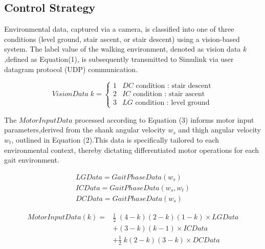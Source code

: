 \documentclass[journal,article,submit,pdftex,moreauthors]{Definitions/mdpi}
\begin{document}
\subsection{Control Strategy}
Environmental data, captured via a camera, is classified into one of three conditions (level ground, stair ascent, or stair descent) using a vision-based system. The label value of the walking environment, denoted as vision data $k$,defined as Equation(1), is subsequently transmitted to Simulink via user datagram protocol (UDP) communication.
\begin{linenomath}
\begin{equation}
\text{$VisionData$}\; k =\begin{cases} 
1 & \text{$DC$ condition : stair descent} \\ 
2 & \text{$IC$ condition : stair ascent} \\
3 & \text{$LG$ condition : level ground}
\end{cases}
\end{equation}
\end{linenomath}
The $MotorInputData$ processed according to Equation (3) informs motor input parameters,derived from the shank angular velocity $w_s$ and thigh angular velocity $w_t$, outlined in Equation (2).This data is specifically tailored to each environmental context, thereby dictating differentiated motor operations for each gait environment.
\begin{linenomath}
\begin{equation}
\begin{aligned}
\text{$LGData=GaitPhaseData(w_s)$} \\
\text{$ICData=GaitPhaseData(w_s,w_t)$} \\
\text{$DCData=GaitPhaseData(w_s)$}
\end{aligned}
\end{equation}
\end{linenomath}

\begin{linenomath}
\begin{equation}
\begin{aligned}
\text{$MotorInputData$}(k) = & \frac{1}{2}\;(4-k)(2-k)(1-k) \times \text{$LGData$}\\
& + (3-k)(k-1) \times \text{$ICData$}\\
& + \frac{1}{2}\;k(2-k)(3-k) \times \text{$DCData$} 
\end{aligned}
\end{equation}
\end{linenomath}
\end{document}

